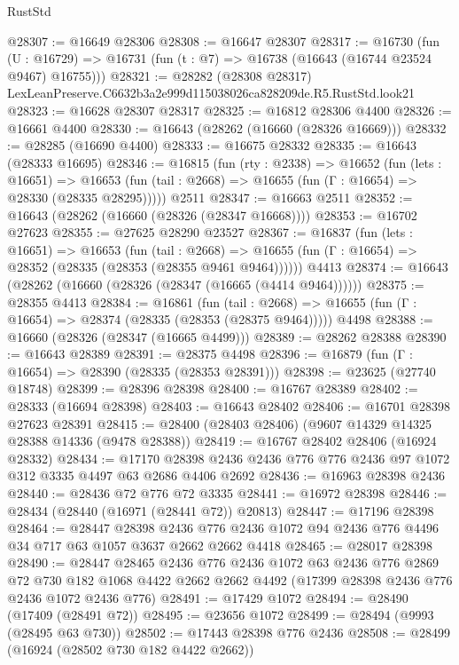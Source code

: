\begin{lexlean}{RustStd}
\begin{coremodule}
@28307 := @16649 @28306
@28308 := @16647 @28307
@28317 := @16730
    (fun (U : @16729) => @16731 (fun (t : @7) => @16738 (@16643 (@16744 @23524 @9467) @16755)))
@28321 := @28282 (@28308 @28317) LexLeanPreserve.C6632b3a2e999d115038026ca828209de.R5.RustStd.look21
@28323 := @16628 @28307 @28317
@28325 := @16812 @28306 @4400
@28326 := @16661 @4400
@28330 := @16643 (@28262 (@16660 (@28326 @16669)))
@28332 := @28285 (@16690 @4400)
@28333 := @16675 @28332
@28335 := @16643 (@28333 @16695)
@28346 := @16815
    (fun (rty : @2338) =>
    @16652
      (fun (lets : @16651) =>
      @16653 (fun (tail : @2668) => @16655 (fun (Γ : @16654) => @28330 (@28335 @28295)))))
    @2511
@28347 := @16663 @2511
@28352 := @16643 (@28262 (@16660 (@28326 (@28347 @16668))))
@28353 := @16702 @27623
@28355 := @27625 @28290 @23527
@28367 := @16837
    (fun (lets : @16651) =>
    @16653
      (fun (tail : @2668) =>
      @16655 (fun (Γ : @16654) => @28352 (@28335 (@28353 (@28355 @9461 @9464))))))
    @4413
@28374 := @16643 (@28262 (@16660 (@28326 (@28347 (@16665 (@4414 @9464))))))
@28375 := @28355 @4413
@28384 := @16861
    (fun (tail : @2668) => @16655 (fun (Γ : @16654) => @28374 (@28335 (@28353 (@28375 @9464)))))
    @4498
@28388 := @16660 (@28326 (@28347 (@16665 @4499)))
@28389 := @28262 @28388
@28390 := @16643 @28389
@28391 := @28375 @4498
@28396 := @16879 (fun (Γ : @16654) => @28390 (@28335 (@28353 @28391)))
@28398 := @23625 (@27740 @18748)
@28399 := @28396 @28398
@28400 := @16767 @28389
@28402 := @28333 (@16694 @28398)
@28403 := @16643 @28402
@28406 := @16701 @28398 @27623 @28391
@28415 := @28400 (@28403 @28406) (@9607 @14329 @14325 @28388 @14336 (@9478 @28388))
@28419 := @16767 @28402 @28406 (@16924 @28332)
@28434 := @17170 @28398 @2436 @2436 @776 @776 @2436 @97 @1072 @312 @3335 @4497 @63 @2686 @4406 @2692
@28436 := @16963 @28398 @2436
@28440 := @28436 @72 @776 @72 @3335
@28441 := @16972 @28398
@28446 := @28434 (@28440 (@16971 (@28441 @72)) @20813)
@28447 := @17196 @28398
@28464 := @28447
    @28398
    @2436
    @776
    @2436
    @1072
    @94
    @2436
    @776
    @4496
    @34
    @717
    @63
    @1057
    @3637
    @2662
    @2662
    @4418
@28465 := @28017 @28398
@28490 := @28447
    @28465
    @2436
    @776
    @2436
    @1072
    @63
    @2436
    @776
    @2869
    @72
    @730
    @182
    @1068
    @4422
    @2662
    @2662
    @4492
    (@17399 @28398 @2436 @776 @2436 @1072 @2436 @776)
@28491 := @17429 @1072
@28494 := @28490 (@17409 (@28491 @72))
@28495 := @23656 @1072
@28499 := @28494 (@9993 (@28495 @63 @730))
@28502 := @17443 @28398 @776 @2436
@28508 := @28499 (@16924 (@28502 @730 @182 @4422 @2662))

\end{coremodule}
\end{lexlean}
